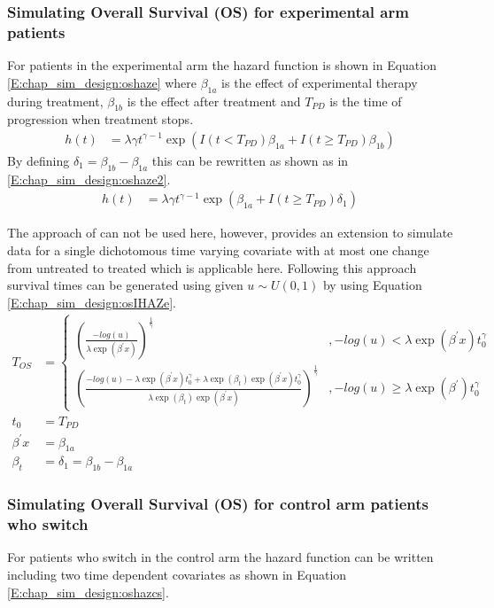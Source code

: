 \subsubsection{Simulating Overall Survival (OS) for experimental arm  patients}

For patients in the experimental arm the hazard function is shown in Equation \ref{E:chap_sim_design:oshaze} where $\beta_{1a}$ is the effect of experimental therapy during treatment, $\beta_{1b}$ is the effect after treatment and $T_{PD}$ is the time of progression when treatment stops. 
\begin{align}
\label{E:chap_sim_design:oshaze}
h(t) &= \lambda \gamma t^{\gamma-1} \exp\left( I( t < T_{PD} ) \beta_{1a} + I(t \geq T_{PD}) \beta_{1b} \right)  
\end{align}
By defining $\delta_1 = \beta_{1b} - \beta_{1a}$ this can be rewritten as shown as in \ref{E:chap_sim_design:oshaze2}. 
\begin{align}
\label{E:chap_sim_design:oshaze2}
h(t) &= \lambda \gamma t^{\gamma-1} \exp\left( \beta_{1a} + I(t \geq T_{PD}) \delta_1 \right) 
\end{align}

The approach of \cite{Bender2005} can not be used here, however, \cite{Austin2012} provides an extension to simulate data for a single dichotomous time varying covariate with at most one change from untreated to treated which is applicable here. Following this approach survival times can be generated using given $u \sim U(0,1)$ by using Equation \ref{E:chap_sim_design:osIHAZe}.
\begin{align}
\label{E:chap_sim_design:osIHAZe}
T_{OS} & = \begin{cases} 
 \left( \frac{-log(u)}{\lambda \exp(\beta^\prime x) } \right) ^\frac{1}{\gamma} 
 & , -log(u) < \lambda \exp(\beta^\prime x) t_0^{\gamma} \\ 
 \left( \frac{-log(u) - \lambda \exp(\beta^\prime x) t_0^{\gamma} + \lambda \exp(\beta_t) \exp(\beta^\prime x) t_0^{\gamma} }{\lambda  \exp(\beta_t)\exp(\beta^\prime x) } \right) ^\frac{1}{\gamma} 
 &  , -log(u) \geq \lambda \exp(\beta^\prime) t_0^{\gamma}
\end{cases} \\
t_0 &= T_{PD}  \nonumber \\
\beta^\prime x &= \beta_{1a} \nonumber \\
\beta_t &= \delta_1 = \beta_{1b} - \beta_{1a} \nonumber
\end{align}

\subsubsection{Simulating Overall Survival (OS) for control arm patients who switch}
For patients who switch in the control arm the hazard function can be written including two time dependent covariates as shown in Equation \ref{E:chap_sim_design:oshazcs}.

